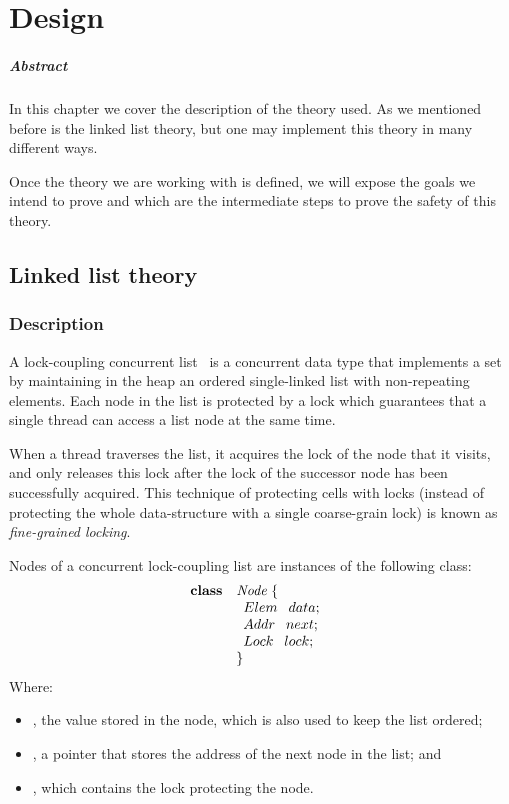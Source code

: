 \chapter{Design\label{chap:design}}

\paragraph{Abstract} In this chapter we cover the description of the theory used. As we mentioned before is the linked list theory, but one may implement this theory in many different ways. 

Once the theory we are working with is defined, we will expose the goals we intend to prove and which are the intermediate steps to prove the safety of this theory.

\section{Linked list theory}

\subsection{Description}

\begin{defn}
A lock-coupling concurrent list~\cite{herlihy08art,vafeiadis06proving} is 
a concurrent data type that implements a set by maintaining in the heap an 
ordered single-linked list with non-repeating elements.
%
Each node in the list is protected by a lock which guarantees that a 
single thread can access a list node at the same time.
%
\end{defn}

When a thread traverses the list, it acquires the lock of the node
that it visits, and only releases this lock after the lock of the
successor node has been successfully acquired.
%
This technique of protecting cells with locks (instead of protecting
the whole data-structure with a single coarse-grain lock) is known as
\emph{fine-grained locking}.

%
Nodes of a concurrent lock-coupling list are instances of the following 
\ListNode class:
%
\[
  \begin{array}{ll}
	  \textbf{class} & \mathit{Node}  \;\{\\
	  		&\begin{array}{l}
				Elem \:\;\; data; \;\\
				Addr \:\;\; next; \;\\
				Lock \:\;\; lock; \;
			\end{array}\\
		&\}
  \end{array}
\]
%
Where:
\begin{itemize}
		\item \fData, the value stored in the node, which is also used to keep 
			the list ordered;
		\item \fNext, a pointer that stores the address of the next node in 
			the list; and
		\item \fLock, which contains the lock protecting the node.
\end{itemize}

